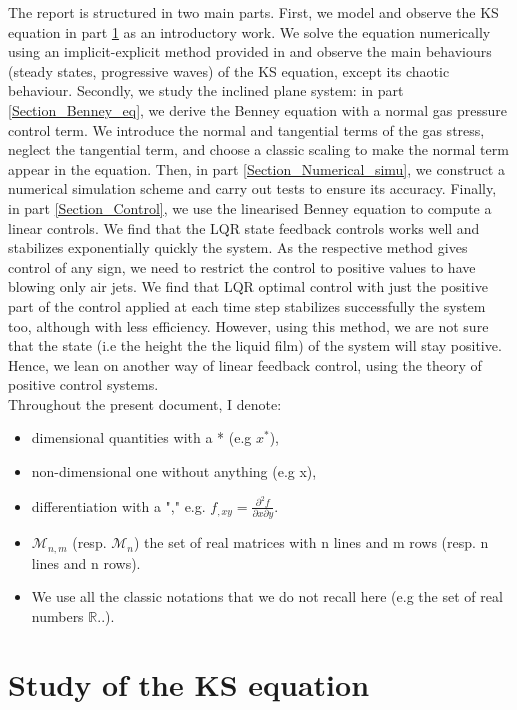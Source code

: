 \documentclass[12pt]{article}
\begin{document}
The report is structured in two main parts. First, we model and observe the KS equation in part \ref{Section_KS_eq} 
as an introductory work. We solve the equation numerically using an implicit-explicit method provided in 
\cite{Scheme_for_KS} and observe the main behaviours (steady states, progressive waves) of the KS equation, except its chaotic 
behaviour. Secondly, we study the inclined plane system: in part \ref{Section_Benney_eq}, we derive the Benney equation with a 
normal gas pressure control term. We introduce the normal and tangential terms of the gas stress, neglect the tangential 
term, and choose a classic scaling to make the normal term appear in the equation.  Then, in part \ref{Section_Numerical_simu}, 
we construct a numerical simulation scheme and carry out tests to ensure its accuracy. Finally, in part \ref{Section_Control}, we 
use the linearised Benney equation to compute a linear controls. We find that the LQR state feedback controls works well and stabilizes
 exponentially quickly the system. As the respective method gives control of any sign, we need to restrict the control to positive values to 
 have blowing only air jets. We find that LQR optimal control with just the positive part of the control applied at each time step stabilizes 
 successfully the system too, although with less efficiency. However, using this method, we are not sure that the state (i.e the height the the 
 liquid film) of the system will stay positive. Hence, we lean on another way of linear feedback control, using the theory of positive control systems. 
\\

Throughout the present document, I denote: 
\begin{itemize}
    \item dimensional quantities with a * (e.g $x^*$), 
    \item non-dimensional one without anything (e.g x), 
    \item differentiation with a "," e.g. $f_{,xy} = \frac{\partial^2 f}{\partial x\partial y}.$
    \item $\mathcal{M}_{n,m}$ (resp. $\mathcal{M}_n$) the set of real matrices with n lines and m rows (resp. n lines and n rows).
    \item We use all the classic notations that we do not recall here (e.g the set of real numbers $\mathbb{R}$..).
\end{itemize}

\newpage
\section{Study of the KS equation}\label{Section_KS_eq}
\end{document}
